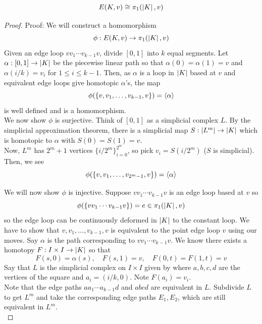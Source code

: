 \begin{theorem}
    \[ E(K, v) \cong \pi_1(\left\lvert {K} \right\rvert, v) \]
\end{theorem}
\begin{proof}{Proof:}
    We will construct a homomorphism
    \[ \phi : E(K, v) \to \pi_1(\left\lvert {K} \right\rvert, v) \]
    Given an edge loop $v v_1 \cdots v_{k - 1} v$, divide $[0, 1]$ into $k$ equal segments. Let $\alpha : [0, 1] \to \left\lvert {K} \right\rvert$ be the piecewise linear path so that $\alpha(0) = \alpha(1) = v$ and $\alpha(i/k) = v_i$ for $1 \leq i \leq k - 1$. Then, as $\alpha$ is a loop in $\left\lvert {K} \right\rvert$ based at $v$ and equivalent edge loops give homotopic $\alpha$'s, the map
    \[ \phi(\{v, v_1, \ldots, v_{k - 1}, v\}) = \left\langle {\alpha} \right\rangle \]
    is well defined and is a homomorphism.\\

    We now show $\phi$ is surjective. Think of $[0, 1]$ as a simplicial complex $L$. By the simplicial approximation theorem, there is a simplicial map $S : \left\lvert {L^m} \right\rvert \to \left\lvert {K} \right\rvert$ which is homotopic to $\alpha$ with $S(0) = S(1) = v$.\\

    Now, $L^m$ has $2^m + 1$ vertices $\{i/2^m\}_{i = 0}^{2^m}$, so pick $v_i = S(i/2^m)$ ($S$ is simplicial). Then, we see
    \[ \phi(\{v, v_1, \ldots, v_{2^m - 1}, v\}) = \left\langle {\alpha} \right\rangle \]

    We will now show $\phi$ is injective. Suppose $v v_1 \cdots v_{k - 1} v$ is an edge loop based at $v$ so
    \[ \phi(\{v v_1 \cdots v_{k - 1} v\}) = e \in \pi_1(\left\lvert {K} \right\rvert, v) \]
    so the edge loop can be continuously deformed in $\left\lvert {K} \right\rvert$ to the constant loop. We have to show that $v, v_1, \ldots, v_{k - 1}, v$ is equivalent to the point edge loop $v$ using our moves. Say $\alpha$ is the path corresponding to $v v_1 \cdots v_{k - 1} v$. We know there exists a homotopy $F : I \times I \to \left\lvert {K} \right\rvert$ so that
    \[ F(s, 0) = \alpha(s), \quad F(s, 1) = v, \quad F(0, t) = F(1, t) = v \]
    Say that $L$ is the simplicial complex on $I \times I$ given by
    where $a, b, c, d$ are the vertices of the square and $a_i = (i/k, 0)$. Note $F(a_i) = v_i$.\\

    Note that the edge paths $a a_1 \cdots a_{k - 1} d$ and $a b c d$ are equivalent in $L$. Subdivide $L$ to get $L^m$ and take the corresponding edge paths $E_1, E_2$, which are still equivalent in $L^m$.\\


\end{proof}
